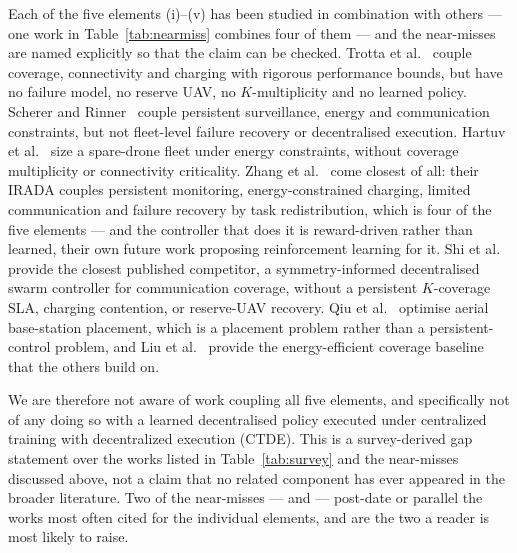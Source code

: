 \documentclass[conference]{IEEEtran}
\begin{document}
Each of the five elements (i)--(v) has been studied in combination with others --- one work in Table~\ref{tab:nearmiss} combines four of them --- and the near-misses are named explicitly so that the claim can be checked. Trotta et al.~\cite{trotta2018} couple coverage, connectivity and charging with rigorous performance bounds, but have no failure model, no reserve UAV, no $K$-multiplicity and no learned policy. Scherer and Rinner~\cite{scherer2016} couple persistent surveillance, energy and communication constraints, but not fleet-level failure recovery or decentralised execution. Hartuv et al.~\cite{hartuv2018} size a spare-drone fleet under energy constraints, without coverage multiplicity or connectivity criticality. Zhang et al.~\cite{zhang2025} come closest of all: their IRADA couples persistent monitoring, energy-constrained charging, limited communication and failure recovery by task redistribution, which is four of the five elements --- and the controller that does it is reward-driven rather than learned, their own future work proposing reinforcement learning for it. Shi et al.~\cite{shi2025} provide the closest published competitor, a symmetry-informed decentralised swarm controller for communication coverage, without a persistent $K$-coverage SLA, charging contention, or reserve-UAV recovery. Qiu et al.~\cite{qiu2020} optimise aerial base-station placement, which is a placement problem rather than a persistent-control problem, and Liu et al.~\cite{liu2018} provide the energy-efficient coverage baseline that the others build on.

We are therefore not aware of work coupling all five elements, and specifically not of any doing so with a learned decentralised policy executed under centralized training with decentralized execution (CTDE). This is a survey-derived gap statement over the works listed in Table~\ref{tab:survey} and the near-misses discussed above, not a claim that no related component has ever appeared in the broader literature. Two of the near-misses --- \cite{trotta2018} and \cite{shi2025} --- post-date or parallel the works most often cited for the individual elements, and are the two a reader is most likely to raise.
\end{document}

